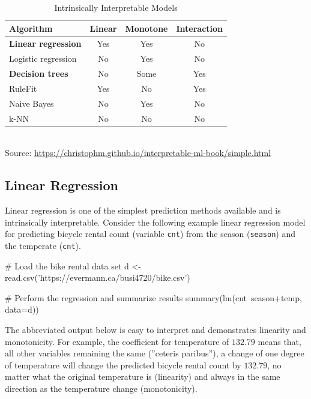 \begin{table}
\centering
\renewcommand{\arraystretch}{1.1}

\begin{tabular}{lccc} \hline
Algorithm & Linear & Monotone & Interaction \\ \hline
\textbf{Linear regression} & Yes & Yes & No  \\ 
Logistic regression & No & Yes & No  \\
\textbf{Decision trees} & No & Some & Yes  \\
RuleFit & Yes & No & Yes  \\
Naive Bayes & No & Yes & No \\
k-NN & No & No & No  \\ \hline
\end{tabular} \\
\vspace{.5\baselineskip}
\scriptsize Source: \url{https://christophm.github.io/interpretable-ml-book/simple.html}\normalsize

\caption{Intrinsically Interpretable Models}
\label{tab:intrinsicmodels}
\end{table}

\subsection{Linear Regression}

Linear regression is one of the simplest prediction methods available and is intrinsically interpretable. Consider the following example linear regression model for predicting bicycle rental count (variable \texttt{cnt}) from the season (\texttt{season}) and the temperate (\texttt{cnt}).

\begin{Rcode}
# Load the bike rental data set
d <- read.csv('https://evermann.ca/busi4720/bike.csv')

# Perform the regression and summarize results
summary(lm(cnt~season+temp, data=d))
\end{Rcode}

The abbreviated output below is easy to interpret and demonstrates linearity and  monotonicity. For example, the coefficient for temperature of $132.79$ means that, all other variables remaining the same (''ceteris paribus''), a change of one degree of temperature will change the predicted bicycle rental count by $132.79$, no matter what the original temperature is (linearity) and always in the same direction as the temperature change (monotonicity). 

